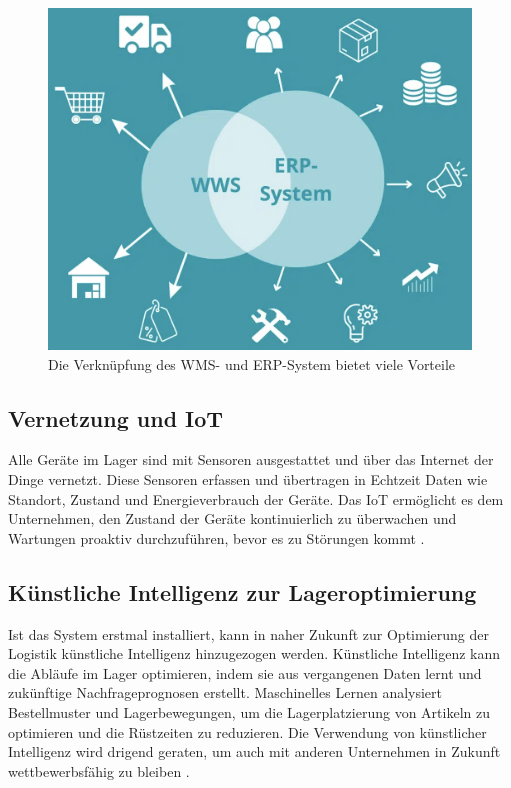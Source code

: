 \begin{figure}[H]
	\centering
	\includegraphics[width=0.8\linewidth]{images/ERP}
	\caption{Die Verknüpfung des WMS- und ERP-System bietet viele Vorteile}
	\label{fig:92105db8-75fe-4262-9bd0-b83cf46d7e20}
\end{figure}

\subsection{Vernetzung und IoT}
 Alle Geräte im Lager sind mit Sensoren ausgestattet und über das Internet der Dinge vernetzt. Diese Sensoren erfassen und übertragen in Echtzeit Daten wie Standort, Zustand und Energieverbrauch der Geräte. Das IoT ermöglicht es dem Unternehmen, den Zustand der Geräte kontinuierlich zu überwachen und Wartungen proaktiv durchzuführen, bevor es zu Störungen kommt \autocites{mulder_internet_2024}.

\subsection{Künstliche Intelligenz zur Lageroptimierung}
Ist das System erstmal installiert, kann in naher Zukunft zur Optimierung der Logistik künstliche Intelligenz hinzugezogen werden. Künstliche Intelligenz kann die Abläufe im Lager optimieren, indem sie aus vergangenen Daten lernt und zukünftige Nachfrageprognosen erstellt. Maschinelles Lernen analysiert Bestellmuster und Lagerbewegungen, um die Lagerplatzierung von Artikeln zu optimieren und die Rüstzeiten zu reduzieren. Die Verwendung von künstlicher Intelligenz wird drigend geraten, um auch mit anderen Unternehmen in Zukunft wettbewerbsfähig zu bleiben \autocite{babel_kunstliche_2024}.


